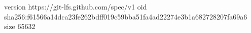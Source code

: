 version https://git-lfs.github.com/spec/v1
oid sha256:f61566a14dca23fe262bdff019c59bba51fa4ad22274e3b1a682728207fa69a6
size 65632
